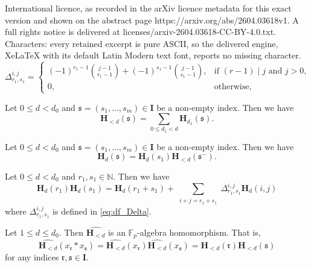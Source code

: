\documentclass[10pt,a4paper]{amsart}
\newcommand{\FF}{\mathbb{F}}
\newcommand{\Ical}{\mathbf{I}}
\newcommand{\NN}{\mathbb{N}}
\newcommand{\ww}[1]{\mathfrak{#1}}
\renewcommand{\H}{\mathbf{H}}
\begin{document}
International licence, as recorded in the arXiv licence metadata for this exact version and shown on the abstract page https://arxiv.org/abs/2604.03618v1. A full rights notice is delivered at licenses/arxiv-2604.03618-CC-BY-4.0.txt. Characters: every retained excerpt is pure ASCII, so the delivered engine, XeLaTeX with its default Latin Modern text font, reports no missing character.
\begin{equation}\label{eq:df_Delta}
\Delta_{r_1,s_1}^{i,j}=\begin{cases} (-1)^{r_1-1}\binom{j-1}{r_1-1}+(-1)^{s_1-1}\binom{j-1}{s_1-1}, & \text{if } (r-1)\mid j \text{ and }j>0,\\ 0, & \text{otherwise},
    \end{cases}
\end{equation} 

\begin{lem}\label{lem:H<d=sumHd}
    Let $0\leq d<d_0$ and $\ww{s}=(s_1,\ldots,s_m)\in\Ical$ be a non-empty index. Then we have
    $$\H_{<d}(\ww{s})=\sum_{0\leq d_1<d}\H_{d_1}(\ww{s}).$$
\end{lem}

\begin{lem}\label{lem:d=d product <d}
     Let $0\leq d<d_0$ and $\ww{s}=(s_1,\ldots,s_m)\in\Ical$ be a non-empty index.  Then we have
    $$\H_{d}(\ww{s})=\H_{d}(s_1)\H_{<d}(\ww{s}^-).$$
\end{lem}

\begin{lem}\label{lem:shuffle base}
     Let $0\leq d< d_0$ and $r_1,s_1\in\NN$. Then we have
    $$\H_{d}(r_1)\H_{d}(s_1)=\H_{d}(r_1+s_1)+\sum_{\substack{i+j=r_1+s_1}}\Delta_{r_1,s_1}^{i,j} \H_{d}(i,j)$$
    where
    $\Delta_{r_1,s_1}^{i,j}$ is defined in \eqref{eq:df_Delta}.
\end{lem}

\begin{thm}\label{thm:abstract-r-shuffle}
    Let $1\leq d\leq d_0$. Then $\widehat{\H_{<d}}$ is an $\FF_p$-algebra homomorphism. That is, 
    $$\widehat{\H_{<d}}(x_{\ww{r}}\ast x_{\ww{s}})=\widehat{\H_{<d}}(x_{\ww{r}})\widehat{\H_{<d}}(x_{\ww{s}})=\H_{<d}(\ww{r})\H_{<d}(\ww{s})$$
    for any indices $\ww{r},\ww{s}\in\Ical$.
\end{thm}
\end{document}
